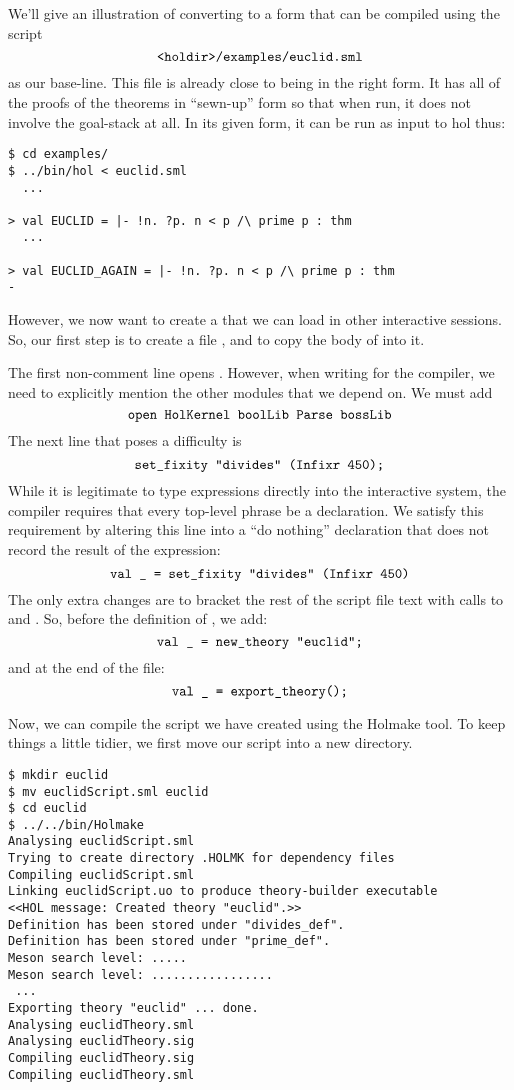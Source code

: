 We'll give an illustration of converting to a form that can be
compiled using the script
\[
  \mbox{\ml{<holdir>/examples/euclid.sml}}
\] as our base-line.  This
file is already close to being in the right form.  It has all of the
proofs of the theorems in ``sewn-up'' form so that when run, it does
not involve the goal-stack at all.  In its given form, it can be run
as input to \textsf{hol} thus:

\setcounter{sessioncount}{0}
\begin{session}
\begin{verbatim}
$ cd examples/
$ ../bin/hol < euclid.sml
  ...

> val EUCLID = |- !n. ?p. n < p /\ prime p : thm
  ...

> val EUCLID_AGAIN = |- !n. ?p. n < p /\ prime p : thm
-
\end{verbatim}
\end{session}

However, we now want to create a  that we can load in
other interactive sessions.  So, our first step is to create a file
, and to copy the body of  into
it.

The first non-comment line opens .  However, when
writing for the compiler, we need to explicitly mention the other
\HOL{} modules that we depend on.  We must add
\[
\mbox{\ml{open HolKernel boolLib Parse bossLib}}
\]
The next line that poses a difficulty is
\[
  \mbox{\ml{set\_fixity "divides" (Infixr 450);}}
\]
While it is legitimate to type expressions directly into the
interactive system, the compiler requires that every top-level phrase
be a declaration.  We satisfy this requirement by altering this line
into a ``do nothing'' declaration that does not record the result of
the expression:
\[
\mbox{\ml{val \_{} = set\_fixity "divides" (Infixr 450)}}
\]
The only extra changes are to bracket the rest of the script file text
with calls to  and .  So,
before the definition of , we add:
\[
\mbox{\ml{val \_{} = new\_theory "euclid";}}
\]
and at the end of the file:
\[
\mbox{\ml{val \_{} = export\_theory();}}
\]

Now, we can compile the script we have created using the
\textsf{Holmake} tool.  To keep things a little tidier, we first move
our script into a new directory.

\begin{session}
\begin{verbatim}
$ mkdir euclid
$ mv euclidScript.sml euclid
$ cd euclid
$ ../../bin/Holmake
Analysing euclidScript.sml
Trying to create directory .HOLMK for dependency files
Compiling euclidScript.sml
Linking euclidScript.uo to produce theory-builder executable
<<HOL message: Created theory "euclid".>>
Definition has been stored under "divides_def".
Definition has been stored under "prime_def".
Meson search level: .....
Meson search level: .................
 ...
Exporting theory "euclid" ... done.
Analysing euclidTheory.sml
Analysing euclidTheory.sig
Compiling euclidTheory.sig
Compiling euclidTheory.sml
\end{verbatim}
\end{session}

